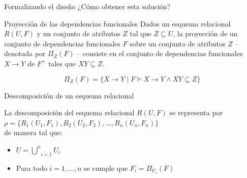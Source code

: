 \begin{frame}{Formalizando el dise\~no}
    \centering
    \Large{ ¿C\'omo obtener esta soluci\'on?}
\end{frame}


\begin{frame}{Proyecci\'on de las dependencias funcionales}
    Dados un esquema relacional $R(U,F)$ y un conjunto de atributos
    $Z$ tal que $Z \subseteq U$, la proyecci\'on de un conjunto de dependencias
    funcionales $F$ sobre un conjunto de atributos $Z$ -- denotada
    por $\Pi_Z(F)$ -- consiste en el conjunto de dependencias funcionales
    $X \to Y$ de $F^+$ tales que $XY \subseteq Z$.
    
    $$
        \Pi_Z(F) = \{X \to Y \;|\; F \models X \to Y \land XY \subseteq Z \}
    $$
\end{frame}







\begin{frame}{Descomposici\'on de un esquema relacional}


        La descomposici\'on del esquema relacional $R(U,F)$ se representa por \\[2mm]
        $\rho = \{R_1(U_1,F_1), R_2(U_2,F_2),...,R_n(U_n,F_n)\}$\\[2mm]
        de manera tal que:
        \begin{itemize}
            \item $U = \underset{i = 1}{\overset{n}{\bigcup}} U_i$
            \item Para todo $i = 1,...,n$ se cumple que $F_i = \Pi_{U_i}(F)$ 
        \end{itemize}
\end{frame}


